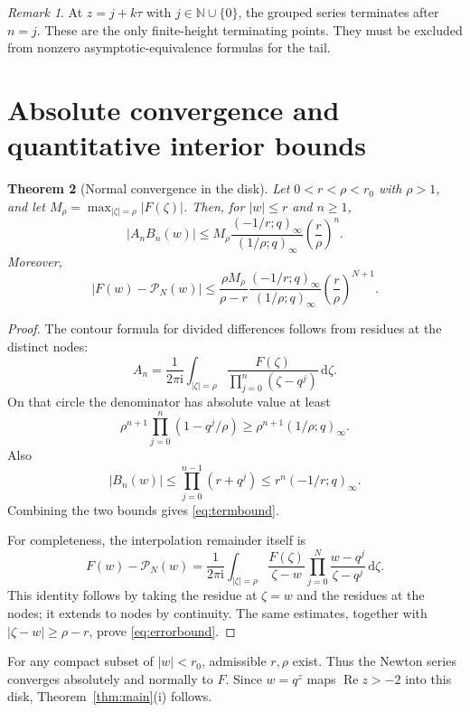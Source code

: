 \documentclass[11pt,letterpaper]{article}
\newtheorem{theorem}{Theorem}[section]
\theoremstyle{definition}\newtheorem{definition}[theorem]{Definition}
\theoremstyle{remark}\newtheorem{remark}[theorem]{Remark}
\newcommand{\N}{\mathbb N}
\newcommand{\Ree}{\operatorname{Re}}
\newcommand{\dd}{\,\mathrm d}
\newcommand{\ii}{\mathrm i}
\numberwithin{equation}{section}
\begin{document}
\begin{remark}
At $z=j+k\tau$ with $j\in\N\cup\{0\}$, the grouped series terminates after $n=j$. These are the only finite-height terminating points. They must be excluded from nonzero asymptotic-equivalence formulas for the tail.
\end{remark}

\section{Absolute convergence and quantitative interior bounds}\label{sec:convergence}

\begin{theorem}[Normal convergence in the disk]\label{thm:normal}
Let $0<r<\rho<r_0$ with $\rho>1$, and let $M_\rho=\max_{|\zeta|=\rho}|F(\zeta)|$. Then, for $|w|\leq r$ and $n\geq1$,
\begin{equation}\label{eq:termbound}
 |A_nB_n(w)|\leq
 M_\rho\frac{(-1/r;q)_\infty}{(1/\rho;q)_\infty}
 \left(\frac r\rho\right)^n.
\end{equation}
Moreover,
\begin{equation}\label{eq:errorbound}
 |F(w)-\mathcal P_N(w)|\leq
 \frac{\rho M_\rho}{\rho-r}
 \frac{(-1/r;q)_\infty}{(1/\rho;q)_\infty}
 \left(\frac r\rho\right)^{N+1}.
\end{equation}
\end{theorem}

\begin{proof}
The contour formula for divided differences follows from residues at the distinct nodes:
\[
 A_n=\frac1{2\pi\ii}\int_{|\zeta|=\rho}
 \frac{F(\zeta)}{\prod_{j=0}^{n}(\zeta-q^j)}\dd\zeta.
\]
On that circle the denominator has absolute value at least
\[
 \rho^{n+1}\prod_{j=0}^{n}(1-q^j/\rho)
 \geq\rho^{n+1}(1/\rho;q)_\infty.
\]
Also
\[
 |B_n(w)|\leq\prod_{j=0}^{n-1}(r+q^j)
 \leq r^n(-1/r;q)_\infty.
\]
Combining the two bounds gives \eqref{eq:termbound}.

For completeness, the interpolation remainder itself is
\[
 F(w)-\mathcal P_N(w)=\frac1{2\pi\ii}\int_{|\zeta|=\rho}
 \frac{F(\zeta)}{\zeta-w}
 \prod_{j=0}^{N}\frac{w-q^j}{\zeta-q^j}\dd\zeta.
\]
This identity follows by taking the residue at $\zeta=w$ and the residues at the nodes; it extends to nodes by continuity. The same estimates, together with $|\zeta-w|\geq\rho-r$, prove \eqref{eq:errorbound}.
\end{proof}

For any compact subset of $|w|<r_0$, admissible $r,\rho$ exist. Thus the Newton series converges absolutely and normally to $F$. Since $w=q^z$ maps $\Ree z>-2$ into this disk, Theorem~\ref{thm:main}(i) follows.
\end{document}
